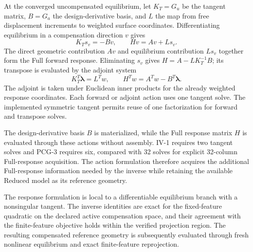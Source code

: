At the converged uncompensated equilibrium, let \(K_T=G_u\) be the tangent matrix, \(B=G_a\) the design-derivative basis, and \(L\) the map from free displacement increments to weighted surface coordinates. Differentiating equilibrium in a compensation direction \(v\) gives
\begin{equation}
K_Ts_v=-Bv,
\qquad
Hv=Av+Ls_v.
\label{eq:native_forward}
\end{equation}
The direct geometric contribution \(Av\) and equilibrium contribution \(Ls_v\) together form the Full forward response. Eliminating \(s_v\) gives \(H=A-LK_T^{-1}B\); its transpose is evaluated by the adjoint system
\begin{equation}
K_T^T\boldsymbol\lambda=L^Tw,
\qquad
H^Tw=A^Tw-B^T\boldsymbol\lambda.
\label{eq:native_adjoint}
\end{equation}
The adjoint is taken under Euclidean inner products for the already weighted response coordinates. Each forward or adjoint action uses one tangent solve. The implemented symmetric tangent permits reuse of one factorization for forward and transpose solves.

The design-derivative basis \(B\) is materialized, while the Full response matrix \(H\) is evaluated through these actions without assembly. IV-1 requires two tangent solves and PCG-3 requires six, compared with 32 solves for explicit 32-column Full-response acquisition. The action formulation therefore acquires the additional Full-response information needed by the inverse while retaining the available Reduced model as its reference geometry.

The response formulation is local to a differentiable equilibrium branch with a nonsingular tangent. The inverse identities are exact for the fixed-feature quadratic on the declared active compensation space, and their agreement with the finite-feature objective holds within the verified projection region. The resulting compensated reference geometry is subsequently evaluated through fresh nonlinear equilibrium and exact finite-feature reprojection.
